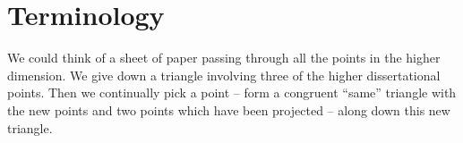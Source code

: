 \section*{Terminology}
	We could think of a sheet of paper passing through all the points in the higher dimension. We give down a triangle involving three of the higher dissertational points. Then we continually pick a point -- form a congruent ``same'' triangle with the new points and two points which have been projected -- along down this new triangle.

